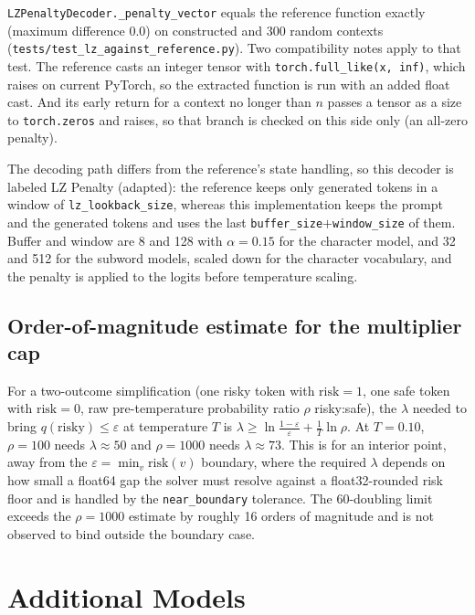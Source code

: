 \documentclass[make,article,submit,pdftex]{Definitions/mdpi}
\newcommand{\risk}{\mathrm{risk}}
\begin{document}
\texttt{LZPenaltyDecoder.\_penalty\_vector} equals the reference function exactly (maximum difference $0.0$) on constructed and 300 random contexts (\texttt{tests/test\_\allowbreak{}lz\_\allowbreak{}against\_\allowbreak{}reference.py}). Two compatibility notes apply to that test. The reference casts an integer tensor with \texttt{torch.full\_like(x, inf)}, which raises on current PyTorch, so the extracted function is run with an added float cast. And its early return for a context no longer than $n$ passes a tensor as a size to \texttt{torch.zeros} and raises, so that branch is checked on this side only (an all-zero penalty).

The decoding path differs from the reference's state handling, so this decoder is labeled LZ Penalty (adapted): the reference keeps only generated tokens in a window of \texttt{lz\_\allowbreak{}lookback\_\allowbreak{}size}, whereas this implementation keeps the prompt and the generated tokens and uses the last \texttt{buffer\_\allowbreak{}size}$+$\texttt{window\_\allowbreak{}size} of them. Buffer and window are 8 and 128 with $\alpha{=}0.15$ for the character model, and 32 and 512 for the subword models, scaled down for the character vocabulary, and the penalty is applied to the logits before temperature scaling.

\subsection{Order-of-magnitude estimate for the multiplier cap}
\label{ssec:lambda-estimate}
\label{app:lambda-estimate}
For a two-outcome simplification (one risky token with $\risk{=}1$, one safe token with $\risk{=}0$, raw pre-temperature probability ratio $\rho$ risky:safe), the $\lambda$ needed to bring $q(\text{risky})\le\varepsilon$ at temperature $T$ is $\lambda\ge\ln\frac{1-\varepsilon}{\varepsilon}+\frac{1}{T}\ln\rho$. At $T{=}0.10$, $\rho{=}100$ needs $\lambda\approx50$ and $\rho{=}1000$ needs $\lambda\approx73$. This is for an interior point, away from the $\varepsilon=\min_v\risk(v)$ boundary, where the required $\lambda$ depends on how small a float64 gap the solver must resolve against a float32-rounded risk floor and is handled by the \texttt{near\_\allowbreak{}boundary} tolerance. The 60-doubling limit exceeds the $\rho{=}1000$ estimate by roughly 16 orders of magnitude and is not observed to bind outside the boundary case.


\section{Additional Models}
\label{sec:generalization}
\end{document}
